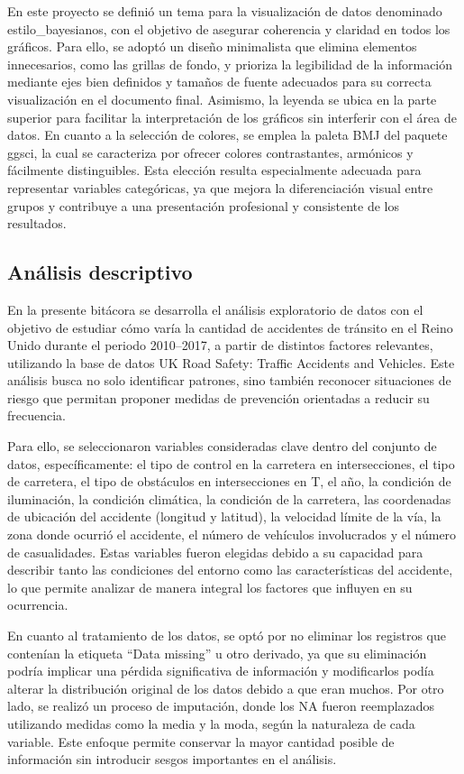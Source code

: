 \documentclass[12pt]{article}
\begin{document}
En este proyecto se definió un tema para la visualización de datos denominado estilo\_bayesianos,
con el objetivo de asegurar coherencia y claridad en todos los gráficos. Para ello, se adoptó un
diseño minimalista que elimina elementos innecesarios, como las grillas de fondo, y prioriza la 
legibilidad de la información mediante ejes bien definidos y tamaños de fuente adecuados para su 
correcta visualización en el documento final. Asimismo, la leyenda se ubica en la parte superior 
para facilitar la interpretación de los gráficos sin interferir con el área de datos. En cuanto a
 la selección de colores, se emplea la paleta BMJ del paquete ggsci, la cual se caracteriza por 
 ofrecer colores contrastantes, armónicos y fácilmente distinguibles. Esta elección resulta 
 especialmente adecuada para representar variables categóricas, ya que mejora la diferenciación 
 visual entre grupos y contribuye a una presentación profesional y consistente de los resultados.


\subsection{Análisis descriptivo}

En la presente bitácora se desarrolla el análisis exploratorio de datos con el 
objetivo de estudiar cómo varía la cantidad de accidentes de tránsito en el Reino 
Unido durante el periodo 2010–2017, a partir de distintos factores relevantes, 
utilizando la base de datos UK Road Safety: Traffic Accidents and Vehicles. 
Este análisis busca no solo identificar patrones, sino también reconocer 
situaciones de riesgo que permitan proponer medidas de prevención orientadas 
a reducir su frecuencia.

Para ello, se seleccionaron variables consideradas clave dentro del conjunto 
de datos, específicamente: el tipo de control en la carretera en intersecciones, 
el tipo de carretera, el tipo de obstáculos en intersecciones en T, el año, la 
condición de iluminación, la condición climática, la condición de la carretera, 
las coordenadas de ubicación del accidente (longitud y latitud), la velocidad 
límite de la vía, la zona donde ocurrió el accidente, el número de vehículos 
involucrados y el número de casualidades. Estas variables fueron elegidas debido 
a su capacidad para describir tanto las condiciones del entorno como las 
características del accidente, lo que permite analizar de manera integral 
los factores que influyen en su ocurrencia.

En cuanto al tratamiento de los datos, se optó por no eliminar los registros 
que contenían la etiqueta “Data missing” u otro derivado, ya que su eliminación 
podría implicar una pérdida significativa de información y modificarlos podía 
alterar la distribución original de los datos debido a que eran muchos. 
Por otro lado, se realizó un proceso de imputación, donde los NA fueron 
reemplazados utilizando medidas como la media y la moda, según la naturaleza de 
cada variable. Este enfoque permite conservar la mayor cantidad posible de 
información sin introducir sesgos importantes en el análisis.
\end{document}
